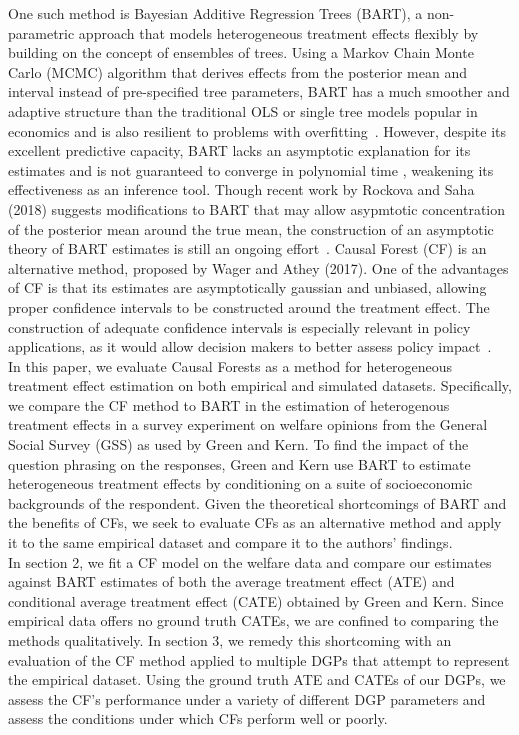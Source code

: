 \documentclass[12pt]{article}
\begin{document}
One such method is Bayesian Additive Regression Trees (BART), a non-parametric
approach that models heterogeneous treatment effects flexibly by building on the
concept of ensembles of trees. Using a Markov Chain Monte Carlo (MCMC) algorithm
that derives effects from the posterior mean and interval instead of
pre-specified tree parameters, BART has a much smoother and adaptive structure
than the traditional OLS or single tree models popular in economics and is also
resilient to problems with overfitting~\cite{greenkern2012}. However, despite its
excellent predictive capacity, BART lacks an asymptotic explanation for its
estimates and is not guaranteed to converge in polynomial time
\cite{atheywager2019}, weakening its effectiveness as an inference tool. Though
recent work by Rockova and Saha (2018) suggests modifications to BART that may
allow asypmtotic concentration of the posterior mean around the true mean, the
construction of an asymptotic theory of BART estimates is still an ongoing
effort~\cite{rockova2018theory}. Causal Forest (CF) is an alternative method,
proposed by Wager and Athey (2017). One of the advantages of CF is that its
estimates are asymptotically gaussian and unbiased, allowing proper confidence
intervals to be constructed around the treatment effect. The construction of
adequate confidence intervals is especially relevant in policy applications, as
it would allow decision makers to better assess policy impact~\cite{atheywager2019}. \\ 

In this paper, we evaluate Causal Forests as a method for heterogeneous
treatment effect estimation on both empirical and simulated datasets.
Specifically, we compare the CF method to BART in the estimation of heterogenous
treatment effects in a survey experiment on welfare opinions from the General
Social Survey (GSS) as used by Green and Kern. To find the impact of the question
phrasing on the responses, Green and Kern use BART to estimate heterogeneous
treatment effects by conditioning on a suite of socioeconomic backgrounds of the
respondent. Given the theoretical shortcomings of BART and the benefits of CFs,
we seek to evaluate CFs as an alternative method and apply it to the same empirical
dataset and compare it to the authors' findings. \\

In section 2, we fit a CF model on the welfare data and compare our estimates
against BART estimates of both the average treatment effect (ATE) and
conditional average treatment effect (CATE) obtained by Green and Kern. Since
empirical data offers no ground truth CATEs, we are confined to comparing the
methods qualitatively. In section 3, we remedy this shortcoming
with an evaluation of the CF method applied to multiple DGPs that attempt to
represent the empirical dataset. Using the ground truth ATE and CATEs of our
DGPs, we assess the CF's performance under a variety of different DGP parameters
and assess the conditions under which CFs perform well or poorly. \\
\end{document}
